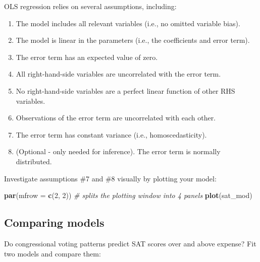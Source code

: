 \documentclass[]{book}
\newenvironment{Shaded}{\begin{snugshade}}{\end{snugshade}}
\newcommand{\CommentTok}[1]{\textcolor[rgb]{0.56,0.35,0.01}{\textit{#1}}}
\newcommand{\DataTypeTok}[1]{\textcolor[rgb]{0.13,0.29,0.53}{#1}}
\newcommand{\DecValTok}[1]{\textcolor[rgb]{0.00,0.00,0.81}{#1}}
\newcommand{\KeywordTok}[1]{\textcolor[rgb]{0.13,0.29,0.53}{\textbf{#1}}}
\newcommand{\NormalTok}[1]{#1}
\newcommand{\OperatorTok}[1]{\textcolor[rgb]{0.81,0.36,0.00}{\textbf{#1}}}
\newcommand{\StringTok}[1]{\textcolor[rgb]{0.31,0.60,0.02}{#1}}
\providecommand{\tightlist}{%
  \setlength{\itemsep}{0pt}\setlength{\parskip}{0pt}}
\begin{document}
OLS regression relies on several assumptions, including:

\begin{enumerate}
\def\labelenumi{\arabic{enumi}.}
\tightlist
\item
  The model includes all relevant variables (i.e., no omitted variable bias).
\item
  The model is linear in the parameters (i.e., the coefficients and error term).
\item
  The error term has an expected value of zero.
\item
  All right-hand-side variables are uncorrelated with the error term.
\item
  No right-hand-side variables are a perfect linear function of other RHS variables.
\item
  Observations of the error term are uncorrelated with each other.
\item
  The error term has constant variance (i.e., homoscedasticity).
\item
  (Optional - only needed for inference). The error term is normally distributed.
\end{enumerate}

Investigate assumptions \#7 and \#8 visually by plotting your model:

\begin{Shaded}
\begin{Highlighting}[]
  \KeywordTok{par}\NormalTok{(}\DataTypeTok{mfrow =} \KeywordTok{c}\NormalTok{(}\DecValTok{2}\NormalTok{, }\DecValTok{2}\NormalTok{)) }\CommentTok{# splits the plotting window into 4 panels}
  \KeywordTok{plot}\NormalTok{(sat_mod)}
\end{Highlighting}
\end{Shaded}

\hypertarget{comparing-models}{%
\subsection{Comparing models}\label{comparing-models}}

Do congressional voting patterns predict SAT scores over and above expense? Fit two models and compare them:

\begin{Shaded}
\end{Shaded}
\end{document}
